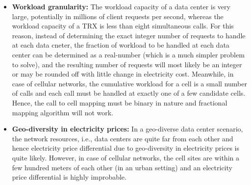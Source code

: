 \begin{itemize}
\item \textbf{Workload granularity:} The workload capacity of a data center is very large, potentially in millions of client requests per second, whereas the workload capacity of a TRX is less than eight simultaneous calls. For this reason, instead of determining the exact integer number of requests to handle at each data cneter, the fraction of workload to be handled at each data center can be determined as a real-number (which is a much simpler problem to solve), and the resulting number of requests will most likely be an integer or may be rounded off with little change in electricity cost. Meanwhile, in case of cellular networks, the cumulative workload for a cell is a small number of calls and each call must be handled at exactly one of a few candidate cells. Hence, the call to cell mapping must be binary in nature and fractional mapping algorithm will not work.
\item \textbf{Geo-diversity in electricity prices:} In a geo-diverse data center scenario, the network resources, i.e., data centers are quite far from each other and hence electricity price differential due to geo-diversity in electricity prices is quite likely. However, in case of cellular networks, the cell sites are within a few hundred meters of each other (in an urban setting) and an electricity price differential is highly improbable. 
\end{itemize}



